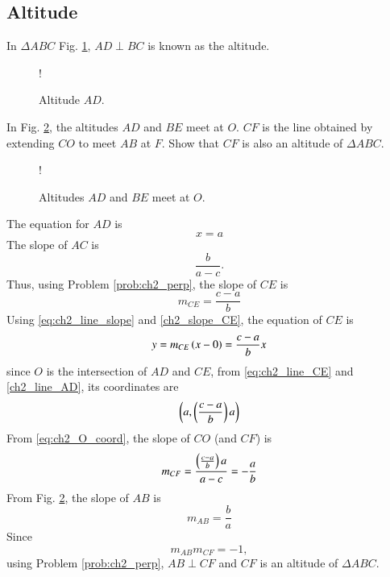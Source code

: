 \subsection{Altitude}
\begin{definition}
In $\Delta ABC$ Fig. \ref{fig:ch2_alt_def}, $AD \perp BC$ is known as the altitude.
\end{definition}
%
\begin{figure}[!h]
\centering
\resizebox {\columnwidth} {!} {

}
\caption{Altitude $AD$.}
\label{fig:ch2_alt_def}
\end{figure}
\begin{problem}
In Fig. \ref{fig:ch2_alt_ortho}, the  altitudes $AD$ and $BE$ meet at $O$.  $CF$ is the line obtained by extending $CO$ to meet $AB$ at $F$.  Show that $CF$ is also an altitude of $\Delta ABC$.
\end{problem}
%
\begin{figure}[!h]
\centering
\resizebox {\columnwidth} {!} {

}
\caption{Altitudes $AD$ and $BE$ meet at $O$.}
\label{fig:ch2_alt_ortho}
\end{figure}
\proof The equation for $AD$ is
%
\begin{equation}
\label{ch2_line_AD}
x = a
\end{equation}
%
The slope of $AC$ is
%
\begin{equation}
\label{ch2_slope_AC}
\frac{b}{a-c}.
\end{equation}
%
Thus, using Problem \ref{prob:ch2_perp}, the slope of $CE$ is 
\begin{equation}
\label{ch2_slope_CE}
m_{CE} = \frac{c-a}{b}
\end{equation}
%
Using \eqref{eq:ch2_line_slope} and \eqref{ch2_slope_CE}, the equation of $CE$ is
\begin{equation}
\label{eq:ch2_line_CE}
y = m_{CE}\left(x-0\right) = \frac{c-a}{b}x
\end{equation}
since $O$ is the intersection of $AD$ and $CE$, from \eqref{eq:ch2_line_CE} and  \eqref{ch2_line_AD}, its coordinates are
\begin{equation}
\label{eq:ch2_O_coord}
\left(a,\left(\frac{c-a}{b}\right)a\right)
\end{equation}
%
From \eqref{eq:ch2_O_coord}, the slope of $CO$ (and $CF$) is
%
\begin{equation}
\label{eq:ch2_slope_CF}
m_{CF} = \frac{\left(\frac{c-a}{b}\right)a}{a-c} = -\frac{a}{b}
\end{equation}
%
From Fig. \ref{fig:ch2_alt_ortho}, the slope of $AB$ is
%
\begin{equation}
m_{AB} = \frac{b}{a}
\end{equation}
%
Since
%
\begin{equation}
m_{AB}m_{CF} = -1,
\end{equation}
%
using Problem \ref{prob:ch2_perp}, $AB \perp CF$ and $CF$ is an altitude of $\Delta ABC$.